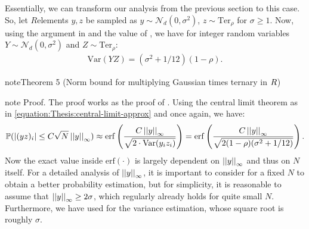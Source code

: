 \documentclass[letterpaper,10pt,english]{jupyterBook}
\begin{document}
\sphinxAtStartPar
Essentially, we can transform our analysis from the previous section to this case.
So, let \(R\)\sphinxhyphen{}elements \(y,z\) be sampled as \(y \sim \mathcal N_d(0,\sigma^2)\), \(z \sim \mathrm{Ter}_\rho\) for \(\sigma \ge 1\).
Now, using the argument in {\hyperref[\detokenize{Thesis:uniform-times-ternary}]{}} and the value of {\hyperref[\detokenize{Thesis:discrete-variance}]{}}, we have for integer random variables \(Y \sim \mathcal N_d(0,\sigma^2)\) and \(Z \sim \mathrm{Ter}_\rho\):
\begin{equation*}
\begin{split}\mathrm{Var}(YZ) = (\sigma^2 + 1/12)(1-\rho).\end{split}
\end{equation*}\label{Thesis:multiplication-bound-gaussian-ternary}
\begin{sphinxadmonition}{note}{Theorem 5 (Norm bound for multiplying Gaussian times ternary in \protect\(R\protect\))}
\end{sphinxadmonition}

\begin{sphinxadmonition}{note}
\sphinxAtStartPar
Proof. The proof works as the proof of {\hyperref[\detokenize{Thesis:multiplication-bound-uniform-ternary}]{}}.
Using the central limit theorem as in \eqref{equation:Thesis:central-limit-approx} and {\hyperref[\detokenize{Thesis:uniform-times-ternary}]{}} once again, we have:
\begin{equation*}
\begin{split}\mathbb P(\left\lvert (yz)_i \right\rvert \le C\sqrt{N}\left\lvert\left\lvert y \right\rvert\right\rvert_\infty) \approx \mathrm{erf} \left( \frac{C\left\lvert\left\lvert y \right\rvert\right\rvert_\infty }{\sqrt{2\cdot \mathrm{Var}(y_iz_i)}}\right) = \mathrm{erf} \left( \frac{C\left\lvert\left\lvert y \right\rvert\right\rvert_\infty}{\sqrt{2(1-\rho)(\sigma^2+1/12)}}\right).\end{split}
\end{equation*}
\sphinxAtStartPar
Now the exact value inside \(\mathrm{erf}(\cdot)\) is largely dependent on \(\left\lvert\left\lvert y \right\rvert\right\rvert_\infty\) and thus on \(N\) itself.
For a detailed analysis of \(\left\lvert\left\lvert y \right\rvert\right\rvert_\infty\), it is important to consider {\hyperref[\detokenize{Thesis:sampling-bound}]{}} for a fixed \(N\) to obtain a better probability estimation, but for simplicity, it is reasonable to assume that \(\left\lvert\left\lvert y \right\rvert\right\rvert_\infty \ge 2\sigma\), which regularly already holds for quite small \(N\).
Furthermore, we have used {\hyperref[\detokenize{Thesis:discrete-variance}]{}} for the variance estimation, whose square root is roughly \(\sigma\).
\end{sphinxadmonition}
\end{document}

